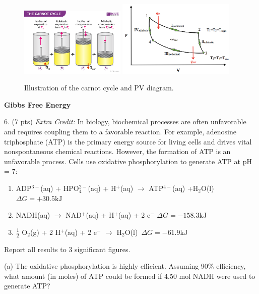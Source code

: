 \documentclass[11pt]{article}
\begin{document}
\begin{figure}[hbpt]
  \includegraphics[width=0.45\textwidth]{carnot.png}
  \includegraphics[width=0.5\textwidth]{pv_carnot.png}
  \caption{Illustration of the carnot cycle and PV diagram.}
  \label{fig:carnot}
\end{figure}

\pagebreak

\textbf{Gibbs Free Energy}

6. (7 pts) \textit{Extra Credit:} In biology, biochemical processes are often unfavorable and
requires coupling them to a favorable reaction. For example, adenosine triphosphate (ATP) is
the primary energy source for living cells and drives vital nonspontaneous chemical reactions.
However, the formation of ATP is an unfavorable process. Cells use oxidative phosphorylation
to generate ATP at pH = 7:
\begin{enumerate}
\item ADP$^{3-}$(aq) + HPO$^{2-}_4$(aq) + H$^+$(aq) $\rightarrow$ ATP$^{4-}$(aq) +H$_2$O(l)
  \hfill $\Delta G = +30.5 \text{kJ}$
\item NADH(aq) $\rightarrow$ NAD$^+$(aq) + H$^+$(aq) + 2 e$^-$
  \hfill $\Delta G = -158.3 \text{kJ}$
\item $\frac{1}{2}$ O$_2$(g) + 2 H$^+$(aq) + 2 e$^-$ $\rightarrow$ H$_2$O(l)
  \hfill $\,\Delta G = -61.9 \text{kJ}$
\end{enumerate}

Report all results to 3 significant figures.

(a) The oxidative phosphorylation is highly efficient.\autocite{Wikstrom2020} Assuming 90$\%$
efficiency, what amount (in moles) of ATP could be formed if 4.50 mol NADH were used to
generate ATP?
\end{document}
